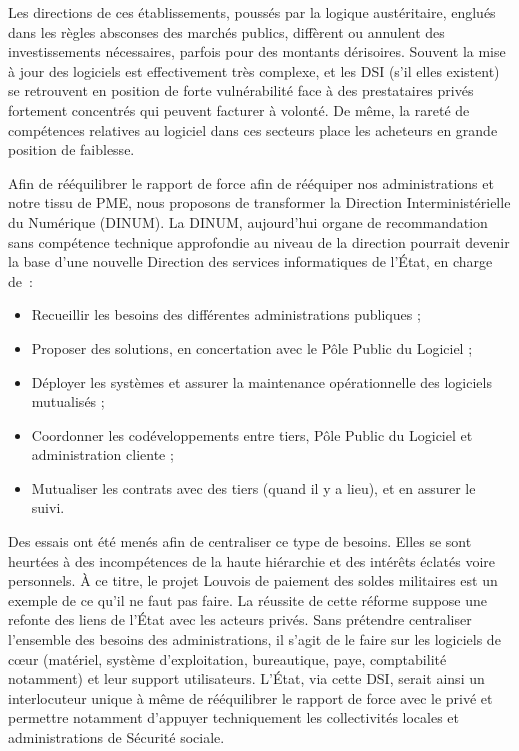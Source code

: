 \documentclass[a4paper]{article}
\begin{document}
Les directions de ces établissements, poussés par la logique austéritaire, englués dans les règles absconses des marchés publics, diffèrent ou annulent des investissements nécessaires, parfois pour des montants dérisoires. Souvent la mise à jour des logiciels est effectivement très complexe, et les DSI (s’il elles existent) se retrouvent en position de forte vulnérabilité face à des prestataires privés fortement concentrés qui peuvent facturer à volonté. De même, la rareté de compétences relatives au logiciel dans ces secteurs place les acheteurs en grande position de faiblesse. 

Afin de rééquilibrer le rapport de force afin de rééquiper nos administrations et notre tissu de PME, nous proposons de transformer la Direction Interministérielle du Numérique (DINUM). La DINUM, aujourd’hui organe de recommandation sans compétence technique approfondie au niveau de la direction pourrait devenir la base d’une nouvelle Direction des services informatiques de l’État, en charge de~:
\begin{itemize}
	\item Recueillir les besoins des différentes administrations publiques ;
	\item Proposer des solutions, en concertation avec le Pôle Public du Logiciel ;
	\item Déployer les systèmes et assurer la maintenance opérationnelle des logiciels mutualisés ;
	\item Coordonner les codéveloppements entre tiers, Pôle Public du Logiciel et administration cliente ; 
	\item Mutualiser les contrats avec des tiers (quand il y a lieu), et en assurer le suivi.
\end{itemize}
Des essais ont été menés afin de centraliser ce type de besoins. Elles se sont heurtées à des incompétences de la haute hiérarchie et des intérêts éclatés voire personnels. À ce titre, le projet Louvois de paiement des soldes militaires est un exemple de ce qu’il ne faut pas faire. La réussite de cette réforme suppose une refonte des liens de l’État avec les acteurs privés. Sans prétendre centraliser l’ensemble des besoins des administrations, il s’agit de le faire sur les logiciels de cœur (matériel, système d’exploitation, bureautique, paye, comptabilité notamment) et leur support utilisateurs. L’État, via cette DSI, serait ainsi un interlocuteur unique à même de rééquilibrer le rapport de force avec le privé et permettre notamment d’appuyer techniquement les collectivités locales et administrations de Sécurité sociale. 
\end{document}
